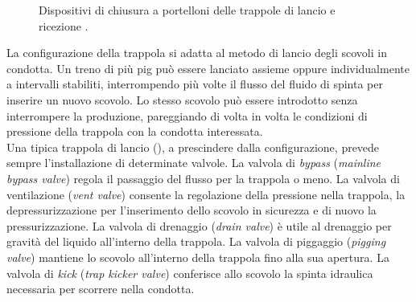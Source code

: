 \begin{figure}[htbp]
    \centering
     \qquad
\caption{Dispositivi di chiusura a portelloni delle trappole di lancio e ricezione \parencite{williamson2015guide}.}
\label{fig:chiusuratrappola}
\end{figure}

La configurazione della trappola si adatta al metodo di lancio degli scovoli in condotta. Un treno di più pig può essere lanciato assieme oppure individualmente a intervalli stabiliti, interrompendo più volte il flusso del fluido di spinta per inserire un nuovo scovolo. Lo stesso scovolo può essere introdotto senza interrompere la produzione, pareggiando di volta in volta le condizioni di pressione della trappola con la condotta interessata.\\
Una tipica trappola di lancio (), a prescindere dalla configurazione, prevede sempre l'installazione di determinate valvole.
La valvola di \textit{bypass} (\textit{mainline bypass valve}) regola il passaggio del flusso per la trappola o meno.
La valvola di ventilazione (\textit{vent valve}) consente la regolazione della pressione nella trappola, la depressurizzazione per l'inserimento dello scovolo in sicurezza e di nuovo la pressurizzazione.
La valvola di drenaggio (\textit{drain valve}) è utile al drenaggio per gravità del liquido all'interno della trappola.
La valvola di piggaggio (\textit{pigging valve}) mantiene lo scovolo all'interno della trappola fino alla sua apertura. 
La valvola di \textit{kick} (\textit{trap kicker valve}) conferisce allo scovolo la spinta idraulica necessaria per scorrere nella condotta.

